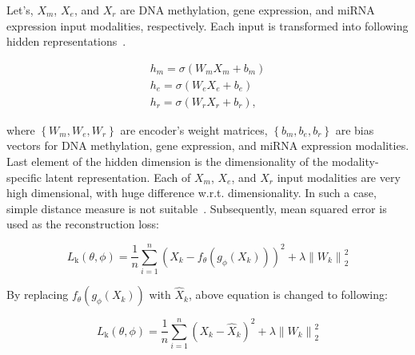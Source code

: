 \hspace*{3.5mm} Let's, $X_m$, $X_e$, and $X_r$ are DNA methylation, gene expression, and miRNA expression input modalities, respectively. Each input is transformed into following hidden representations~\cite{KarimIEEEAccess2019}.

\begin{equation}
    \begin{array}{l}
        {h_{m}=\sigma\left(W_{m} X_{m}+b_{m}\right)} \\
        {h_{e}=\sigma\left(W_{e} X_{e}+b_{e}\right)} \\
        {h_{r}=\sigma\left(W_{r} X_{r}+b_{r}\right),}
    \end{array}
    \label{eq:m1}
\end{equation}  

\hspace*{3.5mm} where $\left\{W_{m}, W_{e}, W_{r}\right\}$ are encoder's weight matrices, $\left\{b_{m}, b_{e}, b_{r}\right\}$ are bias vectors for DNA methylation, gene expression, and miRNA expression modalities. Last element of the hidden dimension is the dimensionality of the modality-specific latent representation. Each of $X_m$, $X_e$, and $X_r$ input modalities are very high dimensional, with huge difference w.r.t. dimensionality. In such a case, simple distance measure is not suitable~\cite{thiam2020multimodal}. Subsequently, mean squared error is used as the reconstruction loss:  

\begin{equation}
    L_{\mathrm{k}}(\theta, \phi)=\frac{1}{n} \sum_{i=1}^{n}\left({X_k}-f_{\theta}\left(g_{\phi}\left({X_k}\right)\right)\right)^{2} +\lambda\left\|W_{k}\right\|_{2}^{2}
\end{equation} 

\hspace*{3.5mm} By replacing $f_{\theta}\left(g_{\phi}\left({X_k}\right)\right)$ with $\hat{X}_{k}$, above equation is changed to following: 

\begin{equation}
    L_{\mathrm{k}}(\theta, \phi)=\frac{1}{n} \sum_{i=1}^{n}\left({X_k}-\hat{X}_{k}\right)^{2} +\lambda\left\|W_{k}\right\|_{2}^{2}
\end{equation} 

